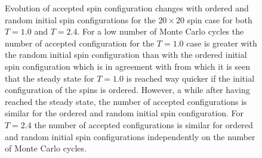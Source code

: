 \begin{figure}[H]
\begin{minipage}{.5\textwidth}
\end{minipage}
\caption{
Evolution of accepted spin configuration changes with ordered and random initial spin configurations for the $20\times 20$ spin case for both $T=1.0$ and $T=2.4$.
For a low number of Monte Carlo cycles the number of accepted configuration for the $T=1.0$ case is greater with the random initial spin configuration than with the ordered initial spin configuration which is in agreement with  from which it is seen that the steady state for $T=1.0$ is reached way quicker if the initial configuration of the spins is ordered. 
However, a while after having reached the steady state, the number of accepted configurations is similar for the ordered and random initial spin configuration. 
For $T=2.4$ the number of accepted configurations is similar for ordered and random initial spin configurations independently on the number of Monte Carlo cycles.  
}
\label{fig:AcceptedConfigurations1}
\end{figure}

